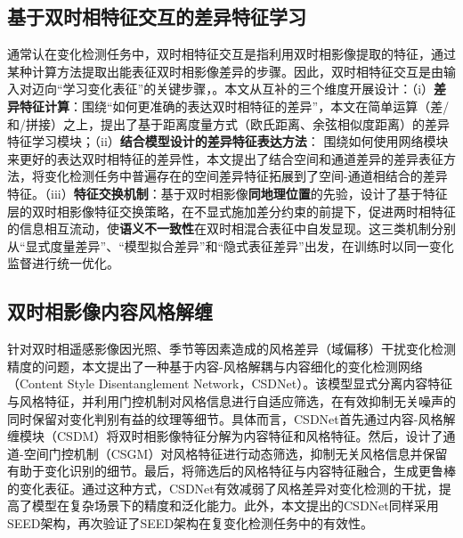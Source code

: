 \subsection{基于双时相特征交互的差异特征学习}
通常认在变化检测任务中，双时相特征交互是指利用双时相影像提取的特征，通过某种计算方法提取出能表征双时相影像差异的步骤。因此，双时相特征交互是由输入对迈向“学习变化表征”的关键步骤，。本文从互补的三个维度开展设计：（i）\textbf{差异特征计算}：围绕“如何更准确的表达双时相特征的差异”，本文在简单运算（差/和/拼接）之上，提出了基于距离度量方式（欧氏距离、余弦相似度距离）的差异特征学习模块；（ii）\textbf{结合模型设计的差异特征表达方法}： 围绕如何使用网络模块来更好的表达双时相特征的差异性，本文提出了结合空间和通道差异的差异表征方法，将变化检测任务中普遍存在的空间差异特征拓展到了空间-通道相结合的差异特征。（iii）\textbf{特征交换机制}：基于双时相影像\textbf{同地理位置}的先验，设计了基于特征层的双时相影像特征交换策略，在不显式施加差分约束的前提下，促进两时相特征的信息相互流动，使\textbf{语义不一致性}在双时相混合表征中自发显现。这三类机制分别从“显式度量差异”、“模型拟合差异”和“隐式表征差异”出发，在训练时以同一变化监督进行统一优化。

\subsection{双时相影像内容风格解缠}

针对双时相遥感影像因光照、季节等因素造成的风格差异（域偏移）干扰变化检测精度的问题，本文提出了一种基于内容-风格解耦与内容细化的变化检测网络（Content Style Disentanglement Network，CSDNet）。该模型显式分离内容特征与风格特征，并利用门控机制对风格信息进行自适应筛选，在有效抑制无关噪声的同时保留对变化判别有益的纹理等细节。具体而言，CSDNet首先通过内容-风格解缠模块（CSDM）将双时相影像特征分解为内容特征和风格特征。然后，设计了通道-空间门控机制（CSGM）对风格特征进行动态筛选，抑制无关风格信息并保留有助于变化识别的细节。最后，将筛选后的风格特征与内容特征融合，生成更鲁棒的变化表征。通过这种方式，CSDNet有效减弱了风格差异对变化检测的干扰，提高了模型在复杂场景下的精度和泛化能力。此外，本文提出的CSDNet同样采用SEED架构，再次验证了SEED架构在复变化检测任务中的有效性。



